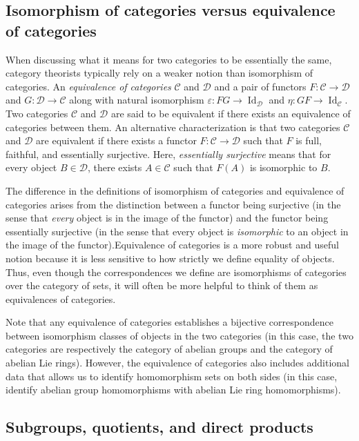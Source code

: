 \documentclass{ucetd}
\begin{document}
\subsection{Isomorphism of categories versus equivalence of categories}

When discussing what it means for two categories to be essentially the
same, category theorists typically rely on a weaker notion than
isomorphism of categories. An {\em equivalence of categories}
$\mathcal{C}$ and $\mathcal{D}$ and a pair of functors $F:\mathcal{C}
\to \mathcal{D}$ and $G:\mathcal{D} \to \mathcal{C}$ along with
natural isomorphism $\varepsilon:FG \to
\operatorname{Id}_{\mathcal{D}}$ and $\eta:GF \to
\operatorname{Id}_{\mathcal{C}}$. Two categories $\mathcal{C}$ and
$\mathcal{D}$ are said to be equivalent if there exists an equivalence
of categories between them. An alternative characterization is that
two categories $\mathcal{C}$ and $\mathcal{D}$ are equivalent if there
exists a functor $F: \mathcal{C} \to \mathcal{D}$ such that $F$ is
full, faithful, and essentially surjective. Here, {\em essentially
  surjective} means that for every object $B \in \mathcal{D}$, there
exists $A \in \mathcal{C}$ such that $F(A)$ is isomorphic to $B$.

The difference in the definitions of isomorphism of categories and
equivalence of categories arises from the distinction between a
functor being surjective (in the sense that {\em every} object is in
the image of the functor) and the functor being essentially surjective
(in the sense that every object is {\em isomorphic} to an object in
the image of the functor).Equivalence of categories is a more robust
and useful notion because it is less sensitive to how strictly we
define equality of objects. Thus, even though the correspondences we
define are isomorphisms of categories over the category of sets, it
will often be more helpful to think of them as equivalences of
categories.

Note that any equivalence of categories establishes a bijective
correspondence between isomorphism classes of objects in the two
categories (in this case, the two categories are respectively the
category of abelian groups and the category of abelian Lie
rings). However, the equivalence of categories also includes
additional data that allows us to identify homomorphism sets on both
sides (in this case, identify abelian group homomorphisms with abelian
Lie ring homomorphisms).

\subsection{Subgroups, quotients, and direct products}\label{sec:abelian-lie-correspondence-sub-quot-dp}
\end{document}
